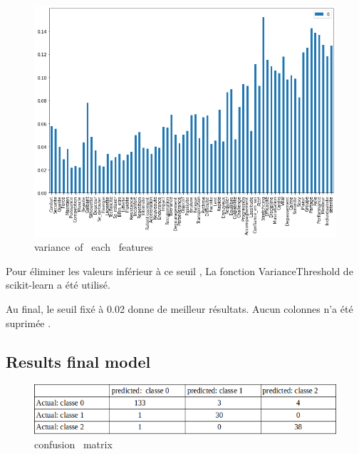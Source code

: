 \documentclass[12pt]{article}
\begin{document}
\begin{figure}[H]
\begin{center}
\includegraphics[scale=0.6]{barlot.png}
\caption[]{ variance\ of \ each \ features}
\end{center}
\end{figure}

Pour éliminer les valeurs inférieur à ce seuil , La fonction VarianceThreshold de scikit-learn a été utilisé.


Au final, le seuil fixé à 0.02 donne de meilleur résultats. Aucun  colonnes n'a été suprimée . 

\subsection{Results final model} 

\begin{figure}[H]
\begin{center}
\includegraphics[scale=0.6]{confusion_matrix_1.png} 
\caption[]{  confusion \ matrix }
\end{center}
\end{figure}
\end{document}
